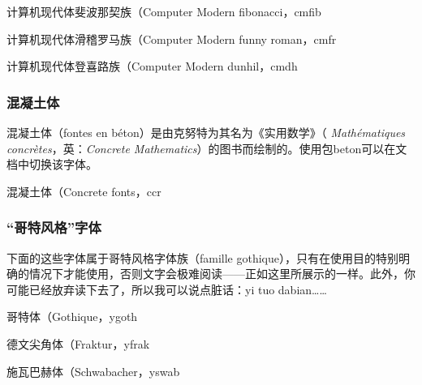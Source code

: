   \begin{decritfonte}{计算机现代体斐波那契族（Computer Modern fibonacci，}{cmfib}
  \end{decritfonte}
  
  \begin{decritfonte}{计算机现代体滑稽罗马族（Computer Modern funny roman，}{cmfr}
  \end{decritfonte}
  
  \begin{decritfonte}{计算机现代体登喜路族（Computer Modern dunhil，}{cmdh}
  \end{decritfonte}

\subsubsection{混凝土体}

{\selectfont 混凝土体（fontes en béton）是由克努特为其名为《实用数学》（ \emph{Mathématiques concrètes}，英：\emph{Concrete Mathematics}}）的图书而绘制的。使用包\textsf{beton}可以在文档中切换该字体。

\begin{decritfonte}[T1]{混凝土体（Concrete fonts，}{ccr}
\end{decritfonte}

\subsubsection{“哥特风格”字体}

{\selectfont 下面的这些字体属于哥特风格字体族（famille gothique），只有在使用目的特别明确的情况下才能使用，否则文字会极难阅读——正如这里所展示的一样。此外，你可能已经放弃读下去了，所以我可以说点脏话：yi tuo dabian……\\
}

\begin{decritfonte}[U]{哥特体（Gothique，}{ygoth}
\end{decritfonte}
\begin{decritfonte}[U]{德文尖角体（Fraktur，}{yfrak}
\end{decritfonte}
\begin{decritfonte}[U]{施瓦巴赫体（Schwabacher，}{yswab}
\end{decritfonte}

